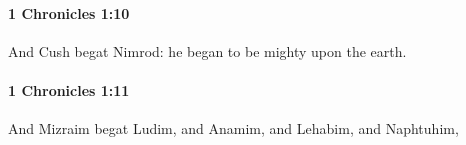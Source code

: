 		\paragraph{1 Chronicles 1:10} %
			\label{1CHRONICLES-1-10}

			And Cush begat Nimrod: he began to be mighty upon the earth.


		\paragraph{1 Chronicles 1:11} %
			\label{1CHRONICLES-1-11}

			And Mizraim begat Ludim, and Anamim, and Lehabim, and Naphtuhim,


